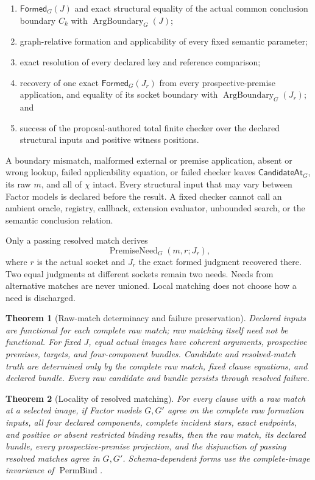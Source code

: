 \documentclass[11pt,twoside]{article}
\newcommand{\Formed}{\mathsf{Formed}}
\newcommand{\CandidateAt}{\mathsf{CandidateAt}}
\newtheorem{theorem}{Theorem}
\begin{document}
\begin{enumerate}[leftmargin=2.2em]
  \item \(\Formed_G(J)\) and exact structural equality of the actual common
        conclusion boundary \(C_k\) with \(\operatorname{ArgBoundary}_G(J)\);
  \item graph-relative formation and applicability of every fixed semantic
        parameter;
  \item exact resolution of every declared key and reference comparison;
  \item recovery of one exact \(\Formed_G(J_r)\) from every prospective-premise
        application, and equality of its socket boundary with
        \(\operatorname{ArgBoundary}_G(J_r)\); and
  \item success of the proposal-authored total finite checker over the declared
        structural inputs and positive witness positions.
\end{enumerate}

A boundary mismatch, malformed external or premise application, absent or wrong
lookup, failed applicability equation, or failed checker leaves
\(\CandidateAt_G\), its raw \(m\), and all of \(\chi\) intact.  Every structural
input that may vary between Factor models is declared before the result.  A fixed
checker cannot call an ambient oracle, registry, callback, extension evaluator,
unbounded search, or the semantic conclusion relation.

Only a passing resolved match derives
\[
  \operatorname{PremiseNeed}_G(m,r;J_r),
\]
where \(r\) is the actual socket and \(J_r\) the exact formed judgment recovered
there.  Two equal judgments at different sockets remain two needs.  Needs from
alternative matches are never unioned.  Local matching does not choose how a need
is discharged.

\begin{theorem}[Raw-match determinacy and failure preservation]%
\label{thm:local-determinacy}
Declared inputs are functional for each complete raw match; raw matching itself
need not be functional.  For fixed \(J\), equal actual images have coherent
arguments, prospective premises, targets, and four-component bundles.  Candidate
and resolved-match truth are determined only by the complete raw match, fixed
clause equations, and declared bundle.  Every raw candidate and bundle persists
through resolved failure.
\end{theorem}

\begin{theorem}[Locality of resolved matching]\label{thm:match-locality}
For every clause with a raw match at a selected image, if Factor models \(G,G'\)
agree on the complete raw formation inputs, all four declared components, complete
incident stars, exact endpoints, and positive or absent restricted binding results,
then the raw match, its declared bundle, every prospective-premise projection, and
the disjunction of passing resolved matches agree in \(G,G'\).  Schema-dependent
forms use the complete-image invariance of
\(\operatorname{PermBind}\).
\end{theorem}
\end{document}
